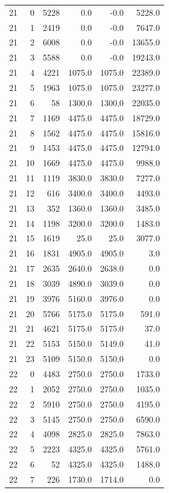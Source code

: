 \begin{longtable}{rrrrrr}
21 & 0 & 5228 & 0.0 & -0.0 & 5228.0\\
21 & 1 & 2419 & 0.0 & -0.0 & 7647.0\\
21 & 2 & 6008 & 0.0 & -0.0 & 13655.0\\
21 & 3 & 5588 & 0.0 & -0.0 & 19243.0\\
21 & 4 & 4221 & 1075.0 & 1075.0 & 22389.0\\
21 & 5 & 1963 & 1075.0 & 1075.0 & 23277.0\\
21 & 6 & 58 & 1300.0 & 1300.0 & 22035.0\\
21 & 7 & 1169 & 4475.0 & 4475.0 & 18729.0\\
21 & 8 & 1562 & 4475.0 & 4475.0 & 15816.0\\
21 & 9 & 1453 & 4475.0 & 4475.0 & 12794.0\\
21 & 10 & 1669 & 4475.0 & 4475.0 & 9988.0\\
21 & 11 & 1119 & 3830.0 & 3830.0 & 7277.0\\
21 & 12 & 616 & 3400.0 & 3400.0 & 4493.0\\
21 & 13 & 352 & 1360.0 & 1360.0 & 3485.0\\
21 & 14 & 1198 & 3200.0 & 3200.0 & 1483.0\\
21 & 15 & 1619 & 25.0 & 25.0 & 3077.0\\
21 & 16 & 1831 & 4905.0 & 4905.0 & 3.0\\
21 & 17 & 2635 & 2640.0 & 2638.0 & 0.0\\
21 & 18 & 3039 & 4890.0 & 3039.0 & 0.0\\
21 & 19 & 3976 & 5160.0 & 3976.0 & 0.0\\
21 & 20 & 5766 & 5175.0 & 5175.0 & 591.0\\
21 & 21 & 4621 & 5175.0 & 5175.0 & 37.0\\
21 & 22 & 5153 & 5150.0 & 5149.0 & 41.0\\
21 & 23 & 5109 & 5150.0 & 5150.0 & 0.0\\
22 & 0 & 4483 & 2750.0 & 2750.0 & 1733.0\\
22 & 1 & 2052 & 2750.0 & 2750.0 & 1035.0\\
22 & 2 & 5910 & 2750.0 & 2750.0 & 4195.0\\
22 & 3 & 5145 & 2750.0 & 2750.0 & 6590.0\\
22 & 4 & 4098 & 2825.0 & 2825.0 & 7863.0\\
22 & 5 & 2223 & 4325.0 & 4325.0 & 5761.0\\
22 & 6 & 52 & 4325.0 & 4325.0 & 1488.0\\
22 & 7 & 226 & 1730.0 & 1714.0 & 0.0\\

\end{longtable}
